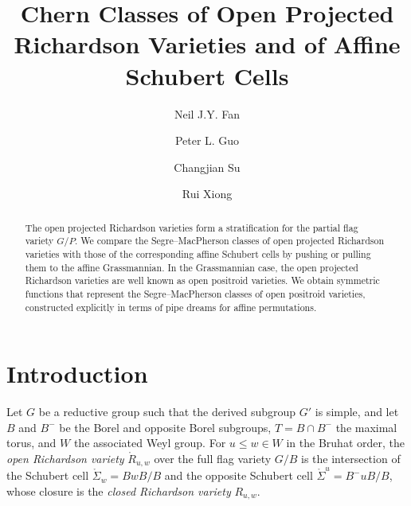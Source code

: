 \documentclass[12pt]{amsart}
\begin{document}
\title[Chern classes of open Projected Richardsons and of affine Schuberts]{Chern Classes of Open Projected Richardson Varieties and of Affine Schubert Cells}


\author{Neil J.Y. Fan}
\address[Neil J.Y. Fan]{Department of Mathematics, 
Sichuan University, Chengdu, Sichuan 610065, P.R. China}

\author{Peter L. Guo}
\address[Peter L. Guo]{Center for Combinatorics, LPMC, 
Nankai University, Tianjin 300071, P.R. China}


\author{Changjian Su}
\address[Changjian Su]{Yau Mathematical Sciences Center, Tsinghua University, Beijing, China}

\author{Rui Xiong}
\address[Rui Xiong]{Department of Mathematics and Statistics, University of Ottawa, 150 Louis-Pasteur, Ottawa, ON, K1N 6N5, Canada}




\begin{abstract}
    The open projected Richardson varieties form a stratification for the partial flag variety $G/P$. We compare the Segre--MacPherson classes of open projected Richardson varieties with those of the corresponding affine Schubert cells by pushing or pulling them to the affine Grassmannian. In the  Grassmannian case, the open projected Richardson varieties are well known as open positroid varieties. We obtain symmetric functions that represent the Segre--MacPherson classes of open positroid varieties, constructed explicitly in terms of pipe dreams for affine permutations.
\end{abstract}

\maketitle




\section{Introduction}

Let $G$ be a reductive group such that the derived subgroup $G'$ is simple, and let $B$ and $B^-$ be the Borel and opposite Borel subgroups,   $T=B\cap B^-$  the maximal torus, and $W$ the associated Weyl group. 
For   $u\leq w\in W$ in the Bruhat order, the {\it open Richardson variety} $\mathring{R}_{u,w}$ over the full flag variety $G/B$ is the intersection of the Schubert cell $\mathring{\Sigma}_{w}=BwB/B$ and the opposite Schubert cell $\mathring{\Sigma}^{u} = B^-uB/B$, whose closure is the {\it closed Richardson variety} $R_{u,w}$. 
\end{document}
